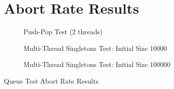 \section{Abort Rate Results}
\label{app:queue_mt}

\begin{table}[H]
\begin{figure}[H]
    \centering
    
    \caption*{Push-Pop Test (2 threads)}
\end{figure}
\begin{figure}[H]
    \centering
        
    \caption*{Multi-Thread Singletons Test: Initial Size 10000}
\end{figure}
\begin{figure}[H]
    \centering
    
    \caption*{Multi-Thread Singletons Test: Initial Size 100000}
\end{figure}
    \caption{Queue Test Abort Rate Results}
\end{table}
